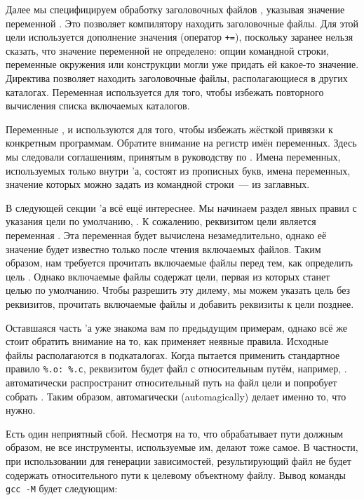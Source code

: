 Далее мы специфицируем обработку заголовочных файлов \Clang{}, указывая
значение переменной . Это позволяет компилятору
находить заголовочные файлы. Для этой цели используется дополнение
значения (оператор \texttt{+=}), поскольку заранее нельзя сказать, что
значение переменной не определено: опции командной строки, переменные
окружения или конструкции \GNUmake{} могли уже придать ей какое-то
значение. Директива  позволяет \GNUmake{} находить
заголовочные файлы, располагающиеся в других каталогах. Переменная
 используется для того, чтобы избежать
повторного вычисления списка включаемых каталогов.

Переменные ,  и  используются
для того, чтобы избежать жёсткой привязки к конкретным программам.
Обратите внимание на регистр имён переменных. Здесь мы следовали
соглашениям, принятым в руководству по \GNUmake{}. Имена переменных,
используемых только внутри \Makefile{}'а, состоят из прописных букв,
имена переменных, значение которых можно задать из командной
строки~--- из заглавных.

В следующей секции \Makefile{}'а всё ещё интереснее. Мы начинаем
раздел явных правил с указания цели по умолчанию, . К
сожалению, реквизитом цели  является переменная
.  Эта переменная будет вычислена незамедлительно,
однако её значение будет известно только после чтения включаемых
файлов. Таким образом, нам требуется прочитать включаемые файлы перед
тем, как определить цель . Однако включаемые файлы
содержат цели, первая из которых станет целью по умолчанию. Чтобы
разрешить эту дилему, мы можем указать цель  без
реквизитов, прочитать включаемые файлы и добавить реквизиты к цели
 позднее.

Оставшаяся часть \Makefile{}'а уже знакома вам по предыдущим примерам,
однако всё же стоит обратить внимание на то, как \GNUmake{} применяет
неявные правила. Исходные файлы располагаются в подкаталогах. Когда
\GNUmake{} пытается применить стандартное правило \texttt{\%.o: \%.c},
реквизитом будет файл с относительным путём, например,
. \GNUmake{} автоматически распространит
относительный путь на файл цели и попробует собрать
. Таким образом, \GNUmake{} автомагически
(automagically) делает именно то, что нужно.

Есть один неприятный сбой. Несмотря на то, что \GNUmake{} обрабатывает
пути должным образом, не все инструменты, используемые им, делают тоже
самое. В частности, при использовании  для генерации
зависимостей, результирующий файл не будет содержать относительного
пути к целевому объектному файлу. Вывод команды \texttt{gcc -M} будет
следующим:

